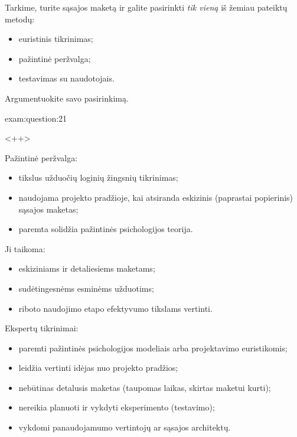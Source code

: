 \begin{question}{%
  Tarkime, turite sąsajos maketą ir galite pasirinkti \emph{tik vieną}
  iš žemiau pateiktų metodų:
  \begin{itemize}
    \item euristinis tikrinimas;
    \item pažintinė peržvalga;
    \item testavimas su naudotojais.
  \end{itemize}
  Argumentuokite savo pasirinkimą.
  }{exam:question:21}

  <++>

  Pažintinė peržvalga\cite[13]{skaidres-9}:
  \begin{itemize}
    \item tikslus užduočių loginių žingsnių tikrinimas;
    \item naudojama projekto pradžioje, kai atsiranda eskizinis (paprastai
      popierinis) sąsajos maketas;
    \item paremta solidžia pažintinės psichologijos teorija.
  \end{itemize}
  Ji taikoma\cite[56]{skaidres-9}:
  \begin{itemize}
    \item eskiziniams ir detaliesiems maketams;
    \item sudėtingesnėms esminėms užduotims;
    \item riboto naudojimo etapo efektyvumo tikslams vertinti.
  \end{itemize}
  
  Ekspertų tikrinimai\cite[9]{skaidres-8}:
  \begin{itemize}
    \item paremti pažintinės psichologijos modeliais arba projektavimo
      euristikomis;
    \item leidžia vertinti idėjas nuo projekto pradžios;
    \item nebūtinas detalusis maketas (taupomas laikas, skirtas maketui
      kurti);
    \item nereikia planuoti ir vykdyti eksperimento (testavimo);
    \item vykdomi panaudojamumo vertintojų ar sąsajos architektų.
  \end{itemize}
\end{question}

